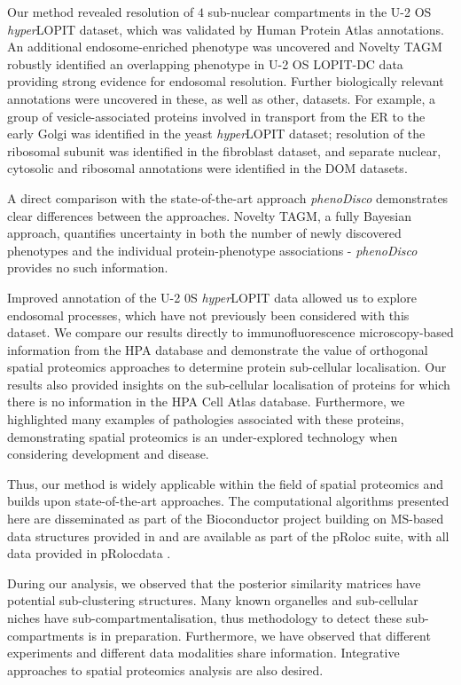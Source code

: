 \documentclass[12pt,english]{article}
\begin{document}
Our method revealed resolution of $4$ sub-nuclear compartments in the U-2 OS \textit{hyper}LOPIT dataset, which was validated by Human Protein Atlas annotations. An additional endosome-enriched phenotype was uncovered and Novelty TAGM robustly identified an overlapping phenotype in U-2 OS LOPIT-DC data providing strong evidence for endosomal resolution. Further biologically relevant annotations were uncovered in these, as well as other, datasets. For example, a group of vesicle-associated proteins involved in transport from the ER to the early Golgi was identified in the yeast \textit{hyper}LOPIT dataset; resolution of the ribosomal subunit was identified in the fibroblast dataset, and separate nuclear, cytosolic and ribosomal annotations were identified in the DOM datasets.

A direct comparison with the state-of-the-art approach \textit{phenoDisco} demonstrates clear differences between the approaches. Novelty TAGM, a fully Bayesian approach, quantifies uncertainty in both the number of newly discovered phenotypes and the individual protein-phenotype associations - \textit{phenoDisco} provides no such information.

Improved annotation of the U-2 0S \textit{hyper}LOPIT data allowed us to explore endosomal processes, which have not previously been considered with this dataset. We compare our results directly to immunofluorescence microscopy-based information from the HPA database and demonstrate the value of orthogonal spatial proteomics approaches to determine protein sub-cellular localisation. Our results also provided insights on the sub-cellular localisation of proteins for which there is no information in the HPA Cell Atlas database. Furthermore, we highlighted many examples of pathologies associated with these proteins, demonstrating spatial proteomics is an under-explored technology when considering development and disease.

Thus, our method is widely applicable within the field of spatial proteomics and builds upon state-of-the-art approaches. The computational algorithms presented here are disseminated as part of the Bioconductor project \citep{Bioconductor::2004, Huber:2015} building on MS-based data structures provided in \cite{MSnbase:2012} and are available as part of the pRoloc suite, with all data provided in pRolocdata \citep{pRoloc:2014}.

During our analysis, we observed that the posterior similarity matrices have potential sub-clustering structures. Many known organelles and sub-cellular niches have sub-compartmentalisation, thus methodology to detect these sub-compartments is in preparation. Furthermore, we have observed that different experiments and different data modalities share information. Integrative approaches to spatial proteomics analysis are also desired. 
\end{document}
